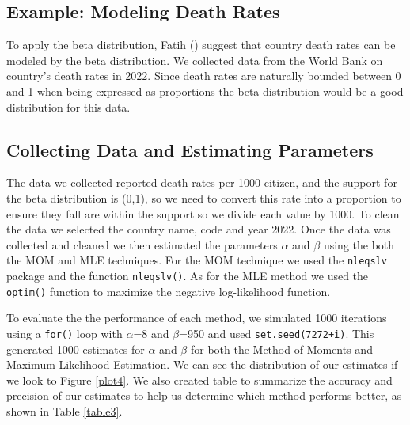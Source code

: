 \documentclass{article}\usepackage[]{graphicx}\usepackage[]{xcolor}
\begin{document}
\begin{multicols}{2}
\section{Example: Modeling Death Rates}
To apply the beta distribution, Fatih (\citeyear{fatih2022determinants}) suggest that country death rates can be modeled by the beta distribution. We collected data from the World Bank on country's death rates in 2022. Since death rates are naturally bounded between 0 and 1 when being expressed as proportions the beta distribution would be a good distribution for this data.  

\subsection{Collecting Data and Estimating Parameters}
The data we collected reported death rates per 1000 citizen, and the support for the beta distribution is (0,1), so we need to convert this rate into a proportion to ensure they fall are within the support so we divide each value by 1000. To clean the data we selected the country name, code and year 2022. Once the data was collected and cleaned we then estimated the parameters $\alpha$ and $\beta$ using the both the MOM and MLE techniques. For the MOM technique we used the \texttt{nleqslv} package \citep{nleqslv} and the function \verb|nleqslv()|. As for the MLE method we used the \verb|optim()| function to maximize the negative log-likelihood function. 

To evaluate the the performance of each method, we simulated 1000 iterations using a \verb|for()| loop with $\alpha$=8 and $\beta$=950 and used \texttt{set.seed(7272+i)}. This generated 1000 estimates for $\alpha$ and $\beta$ for both the Method of Moments and Maximum Likelihood Estimation. We can see the distribution of our estimates if we look to Figure \ref{plot4}. We also created table to summarize the accuracy and precision of our estimates to help us determine which method performs better, as shown in Table \ref{table3}.


\end{multicols}
\end{document}
